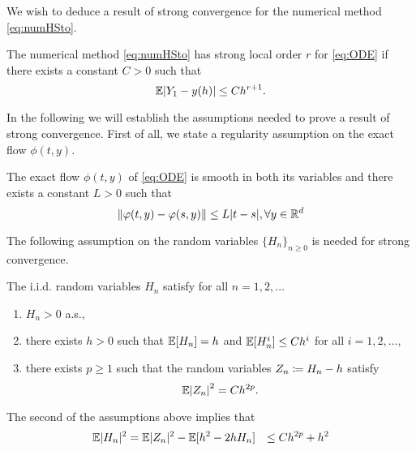 \documentclass{scrartcl}
\begin{document}
We wish to deduce a result of strong convergence for the numerical method \eqref{eq:numHSto}. 
\begin{definition} The numerical method \eqref{eq:numHSto} has strong local order $r$ for \eqref{eq:ODE} if there exists a constant $C > 0$ such that
	\begin{equation}
	\mathbb{E}\abs{Y_1 - y(h)} \leq Ch^{r+1}.
	\end{equation}
\end{definition} 
\noindent In the following we will establish the assumptions needed to prove a result of strong convergence. First of all, we state a regularity assumption on the exact flow $\phi(t,y)$.
\begin{assumption} The exact flow $\phi(t,y)$ of \eqref{eq:ODE} is smooth in both its variables and there exists a constant $L > 0$ such that 
	\begin{equation}
		\norm{\varphi(t, y) - \varphi(s, y)} \leq L|t - s|, \forall y \in \mathbb{R}^d
 	\end{equation}
\end{assumption}
\noindent The following assumption on the random variables $\{H_n\}_{n\geq 0}$ is needed for strong convergence.
\begin{assumption}\label{as:hStrong} The i.i.d. random variables $H_n$ satisfy for all $n = 1, 2, \ldots$
	\begin{enumerate}
		\item $H_n > 0$ a.s.,
		\item there exists $h > 0$ such that $\mathbb{E}[H_n] = h$ and $\mathbb{E}[H_n^i] \leq Ch^i$ for all $i = 1, 2, \ldots$,
		\item there exists $p \geq 1$ such that the random variables $Z_n \coloneqq H_n - h$ satisfy
		\begin{equation}
		\mathbb{E}\abs{Z_n}^2 = Ch^{2p}.
		\end{equation}
	\end{enumerate}
\end{assumption}
\begin{remark} The second of the assumptions above implies that
	\begin{equation}
	\begin{aligned}
	\mathbb{E}|H_n|^2 &= \mathbb{E}|Z_n|^2 - \mathbb{E}[h^2 - 2hH_n]
	&\leq Ch^{2p} + h^2
	\end{aligned}
	\end{equation}	
\end{remark}
\end{document}
